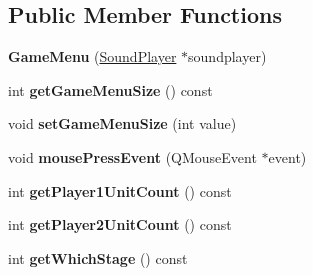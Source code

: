 \subsection*{Public Member Functions}
\begin{DoxyCompactItemize}
\item 
{\bfseries Game\+Menu} (\hyperlink{class_sound_player}{Sound\+Player} $\ast$soundplayer)\hypertarget{class_game_menu_acc7215518fa676e7985aa3f34ca55ef7}{}\label{class_game_menu_acc7215518fa676e7985aa3f34ca55ef7}

\item 
int {\bfseries get\+Game\+Menu\+Size} () const \hypertarget{class_game_menu_adc24456c629b662425a461b7171da615}{}\label{class_game_menu_adc24456c629b662425a461b7171da615}

\item 
void {\bfseries set\+Game\+Menu\+Size} (int value)\hypertarget{class_game_menu_aeb35fbd4176b7069dd59395b39d1950c}{}\label{class_game_menu_aeb35fbd4176b7069dd59395b39d1950c}

\item 
void {\bfseries mouse\+Press\+Event} (Q\+Mouse\+Event $\ast$event)\hypertarget{class_game_menu_ab043085d1280afd8f33c5e962a171373}{}\label{class_game_menu_ab043085d1280afd8f33c5e962a171373}

\item 
int {\bfseries get\+Player1\+Unit\+Count} () const \hypertarget{class_game_menu_ac37e4932a0aa396be6ffb04cad2061b2}{}\label{class_game_menu_ac37e4932a0aa396be6ffb04cad2061b2}

\item 
int {\bfseries get\+Player2\+Unit\+Count} () const \hypertarget{class_game_menu_a9fd03816511faec236d787298237b231}{}\label{class_game_menu_a9fd03816511faec236d787298237b231}

\item 
int {\bfseries get\+Which\+Stage} () const \hypertarget{class_game_menu_a45729234e7d5e250608217f0b24ac8da}{}\label{class_game_menu_a45729234e7d5e250608217f0b24ac8da}

\end{DoxyCompactItemize}
